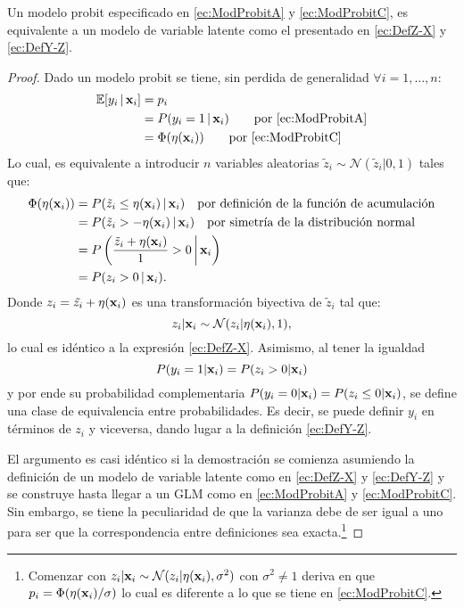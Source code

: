 \documentclass[../Main/Main.tex]{subfiles}
\begin{document}
\begin{theorem} \label{teo:Defs}
Un modelo probit especificado en \eqref{ec:ModProbitA} y \eqref{ec:ModProbitC}, es equivalente a un modelo de variable latente como el presentado en \eqref{ec:DefZ-X} y \eqref{ec:DefY-Z}.
\end{theorem}

\begin{proof} Dado un modelo probit se tiene, sin perdida de generalidad $\forall i = 1,\ldots,n$:
\begin{align*}
	\mathbb{E}[y_i\,|\,\mathbf{x}_i] &= p_i  \\
				&= P(y_i = 1\,|\,\mathbf{x}_i)  \qquad \text{por \eqref{ec:ModProbitA}}\\
				&= \Phi(\eta(\mathbf{x}_i)) \qquad \text{por \eqref{ec:ModProbitC}}
\end{align*}
Lo cual, es equivalente a introducir $n$ variables aleatorias $\tilde{z}_i \sim \mathcal{N}(\tilde{z}_i|0,1)$ tales que:
\begin{align*}
	\Phi(\eta(\mathbf{x}_i)) 	&= P(\tilde{z}_i \leq \eta(\mathbf{x}_i)\,|\,\mathbf{x}_i)
					\quad \text{por definición de la función de acumulación}\\
			      	&= P(\tilde{z}_i > - \eta(\mathbf{x}_i)\,|\,\mathbf{x}_i) \quad \text{por simetría de la distribución normal}\\
			      	&= P\left(\dfrac{\tilde{z}_i + \eta(\mathbf{x}_i)}{1} > 0\,\bigg|\,\mathbf{x}_i\right)\\
			      	&= P(z_i > 0\,|\,\mathbf{x}_i).
\end{align*}
Donde $z_i = \tilde{z_i} + \eta(\mathbf{x}_i)$ es una transformación biyectiva de $\tilde{z}_i$ tal que: 
$$z_i|\mathbf{x}_i \sim \mathcal{N}(z_i|\eta(\mathbf{x}_i),1),$$ 
lo cual es idéntico a la expresión \eqref{ec:DefZ-X}. Asimismo, al tener la igualdad $$P(y_i = 1|\mathbf{x}_i) = P(z_i > 0|\mathbf{x}_i)$$ y por ende su probabilidad complementaria $P(y_i = 0|\mathbf{x}_i) = P(z_i \leq 0|\mathbf{x}_i)$, se define una clase de equivalencia entre probabilidades. Es decir, se puede definir $y_i$ en términos de $z_i$ y viceversa, dando lugar a la definición \eqref{ec:DefY-Z}. 

El argumento es casi idéntico si la demostración se comienza asumiendo la definición de un modelo de variable latente como en \eqref{ec:DefZ-X} y \eqref{ec:DefY-Z} y se construye hasta llegar a un GLM como en  \eqref{ec:ModProbitA} y \eqref{ec:ModProbitC}. Sin embargo, se tiene la peculiaridad de que la varianza debe de ser igual a uno para ser que la correspondencia entre definiciones sea exacta.\footnote{Comenzar con $z_i|\mathbf{x}_i \sim \mathcal{N}(z_i|\eta(\mathbf{x}_i),\sigma^2)$ con $\sigma^2\neq 1$ deriva en que $p_i = \Phi(\eta(\mathbf{x}_i)/\sigma)$ lo cual es diferente a lo que se tiene en \eqref{ec:ModProbitC}.}
\end{proof}
\end{document}
